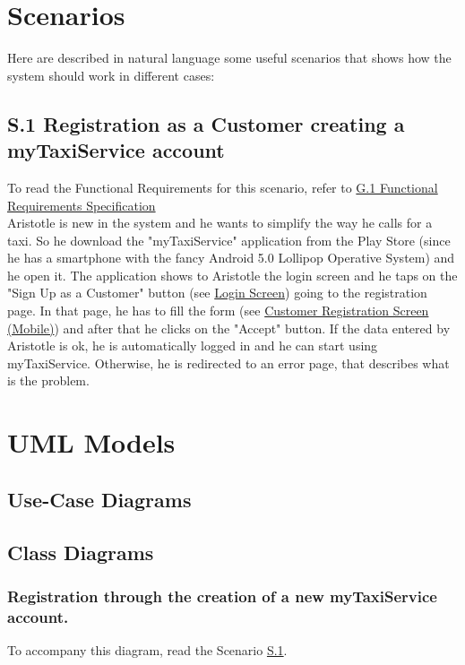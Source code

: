 \documentclass{report}
\begin{document}
	\section{Scenarios}
	Here are described in natural language some useful scenarios that shows how the system should work in different cases:

		\subsection{S.1 Registration as a Customer creating a myTaxiService account }\label{sec:NormalCustomerRegistrationScenario}
		To read the Functional Requirements for this scenario, refer to \hyperref[sec:frs1]{G.1 Functional Requirements Specification}\\

		Aristotle is new in the system and he wants to simplify the way he calls for a taxi. So he download the "myTaxiService" application from the Play Store (since he has a smartphone with the fancy Android 5.0 Lollipop Operative System) and he open it.
		The application shows to Aristotle the login screen and he taps on the "Sign Up as a Customer" button (see \hyperref[login_m]{Login Screen}) going to the registration page. In that page, he has to fill the form (see \hyperref[cregistration_m]{Customer Registration Screen (Mobile)}) and after that he clicks on the "Accept" button. If the data entered by Aristotle is ok, he is automatically logged in and he can start using myTaxiService. Otherwise, he is redirected to an error page, that describes what is the problem. 

	\section{UML Models}

		\subsection{Use-Case Diagrams}

		\subsection{Class Diagrams}

			\subsubsection{Registration through the creation of a new myTaxiService account.}
			To accompany this diagram, read the Scenario \hyperref[sec:NormalCustomerRegistrationScenario]{S.1}.
\end{document}
